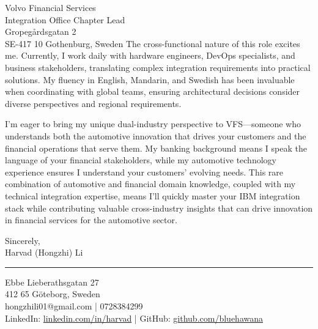 \documentclass[a4paper,10pt]{article}
\begin{document}
\begin{letter}{\color{darkblue}
Volvo Financial Services\\
Integration Office Chapter Lead\\
Gropegårdsgatan 2\\
SE-417 10 Gothenburg, Sweden}
The cross-functional nature of this role excites me. Currently, I work daily with hardware engineers, DevOps specialists, and business stakeholders, translating complex integration requirements into practical solutions. My fluency in English, Mandarin, and Swedish has been invaluable when coordinating with global teams, ensuring architectural decisions consider diverse perspectives and regional requirements.

I'm eager to bring my unique dual-industry perspective to VFS—someone who understands both the automotive innovation that drives your customers and the financial operations that serve them. My banking background means I speak the language of your financial stakeholders, while my automotive technology experience ensures I understand your customers' evolving needs. This rare combination of automotive and financial domain knowledge, coupled with my technical integration expertise, means I'll quickly master your IBM integration stack while contributing valuable cross-industry insights that can drive innovation in financial services for the automotive sector.

\vspace{10pt}

\closing{
Sincerely,\\
\vspace{15pt}
Harvad (Hongzhi) Li
}

\vspace{20pt}

{\color{darkblue}\rule{\linewidth}{0.6pt}}
\vspace{4pt}

{\color{darkblue}
Ebbe Lieberathsgatan 27\\
412 65 Göteborg, Sweden\\
hongzhili01@gmail.com | 0728384299\\
LinkedIn: \href{https://www.linkedin.com/in/harvad/}{linkedin.com/in/harvad} | GitHub: \href{https://github.com/bluehawana}{github.com/bluehawana}
}

\end{letter}
\end{document}
